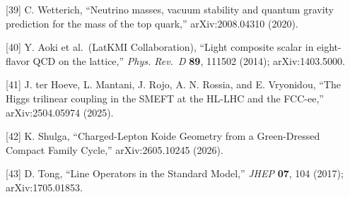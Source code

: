 \documentclass[
]{article}
\begin{document}
{[}39{]} C. Wetterich, ``Neutrino masses, vacuum stability and quantum
gravity prediction for the mass of the top quark,'' arXiv:2008.04310
(2020).

{[}40{]} Y. Aoki et al.~(LatKMI Collaboration), ``Light composite scalar
in eight-flavor QCD on the lattice,'' \emph{Phys. Rev.~D} \textbf{89},
111502 (2014); arXiv:1403.5000.

{[}41{]} J. ter Hoeve, L. Mantani, J. Rojo, A. N. Rossia, and E.
Vryonidou, ``The Higgs trilinear coupling in the SMEFT at the HL-LHC and
the FCC-ee,'' arXiv:2504.05974 (2025).

{[}42{]} K. Shulga, ``Charged-Lepton Koide Geometry from a Green-Dressed
Compact Family Cycle,'' arXiv:2605.10245 (2026).

{[}43{]} D. Tong, ``Line Operators in the Standard Model,'' \emph{JHEP}
\textbf{07}, 104 (2017); arXiv:1705.01853.
\end{document}
